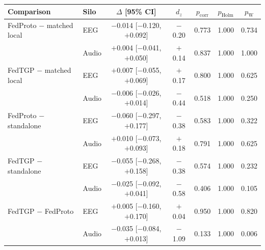 \begin{tabular}{llccccc}
\toprule
\textbf{Comparison} & \textbf{Silo} & \textbf{$\Delta$ [95\% CI]} & \textbf{$d_z$} & \textbf{$p_{\mathrm{corr}}$} & \textbf{$p_{\mathrm{Holm}}$} & \textbf{$p_{\mathrm{W}}$} \\
\midrule
FedProto $-$ matched local & EEG & $-$0.014 [$-$0.120, $+$0.092] & $-$0.20 & 0.773 & 1.000 & 0.734 \\
 & Audio & $+$0.004 [$-$0.041, $+$0.050] & $+$0.14 & 0.837 & 1.000 & 1.000 \\
\midrule
FedTGP $-$ matched local & EEG & $+$0.007 [$-$0.055, $+$0.069] & $+$0.17 & 0.800 & 1.000 & 0.625 \\
 & Audio & $-$0.006 [$-$0.026, $+$0.014] & $-$0.44 & 0.518 & 1.000 & 0.250 \\
\midrule
FedProto $-$ standalone & EEG & $-$0.060 [$-$0.297, $+$0.177] & $-$0.38 & 0.583 & 1.000 & 0.322 \\
 & Audio & $+$0.010 [$-$0.073, $+$0.093] & $+$0.18 & 0.791 & 1.000 & 0.625 \\
\midrule
FedTGP $-$ standalone & EEG & $-$0.055 [$-$0.268, $+$0.158] & $-$0.38 & 0.574 & 1.000 & 0.232 \\
 & Audio & $-$0.025 [$-$0.092, $+$0.041] & $-$0.58 & 0.406 & 1.000 & 0.105 \\
\midrule
FedTGP $-$ FedProto & EEG & $+$0.005 [$-$0.160, $+$0.170] & $+$0.04 & 0.950 & 1.000 & 0.820 \\
 & Audio & $-$0.035 [$-$0.084, $+$0.013] & $-$1.09 & 0.133 & 1.000 & 0.006 \\
\bottomrule
\end{tabular}